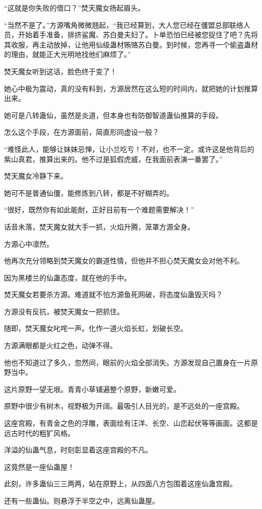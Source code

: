 \begin{this_body}
“这就是你失败的借口？”焚天魔女扬起眉头。

“当然不是了。”方源嘴角微微翘起，“我已经算到，大人您已经在僵盟总部联络人员，开始着手准备，排挤鲨魔、苏白曼夫妇了。卜单恐怕已经被您捉住了吧？先将其收服，再主动放掉，让他用仙级蛊材贿赂苏白曼。到时候，您再寻一个偷盗蛊材的理由，就能正大光明地找他们麻烦了。”

焚天魔女听到这话，脸色终于变了！

她心中极为震动，真的没有料到，方源居然在这么短的时间内，就把她的计划推算出来。

她可是八转蛊仙，虽然是炎道，但本身也有防御智道蛊仙推算的手段。

怎么这个手段，在方源面前，简直形同虚设一般？

“难怪此人，能够让妹妹忌惮，让小兰吃亏！不对，也不一定。或许这是他背后的紫山真君，推算出来的。他不过是狐假虎威，在我面前表演一番罢了。”

焚天魔女冷静下来。

她可不是普通仙僵，能修炼到八转，都是不好糊弄的。

“很好，既然你有如此能耐，正好目前有一个难题需要解决！”

话音未落，焚天魔女就大手一抓，火焰升腾，笼罩方源全身。

方源心中凛然。

他再次充分领略到焚天魔女的霸道性情，但他并不担心焚天魔女会对他不利。

因为黑楼兰的仙蛊态度，就在他的手中。

焚天魔女若要杀方源。难道就不怕方源鱼死网破，将态度仙蛊毁灭吗？

方源没有反抗，被焚天魔女一把抓住。

随即，焚天魔女叱咤一声。化作一道火焰长虹，划破长空。

方源满眼都是火红之色，动弹不得。

他也不知道过了多久，忽然间，眼前的火焰全部消失。方源发现自己置身在一片原野当中。

这片原野一望无垠。青青小草铺遍整个原野，新嫩可爱。

原野中很少有树木，视野极为开阔。最吸引人目光的，是不远处的一座宫殿。

这座宫殿，有青金之色的浮雕，表面绘有汪洋、长空、山峦起伏等等画面。这都是远古时代的粗犷风格。

洋溢的仙蛊气息，时刻彰显着这座宫殿的不凡。

这竟然是一座仙蛊屋！

此刻，许多蛊仙三三两两，站在原野上，从四面八方包围着这座仙蛊宫殿。

还有一些蛊仙。则悬浮于半空之中，远离仙蛊屋。


\end{this_body}
